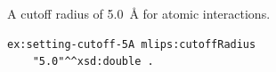 A cutoff radius of 5.0~\AA{} for atomic interactions.
\begin{lstlisting}[language=turtle]
ex:setting-cutoff-5A mlips:cutoffRadius
    "5.0"^^xsd:double .
\end{lstlisting}

